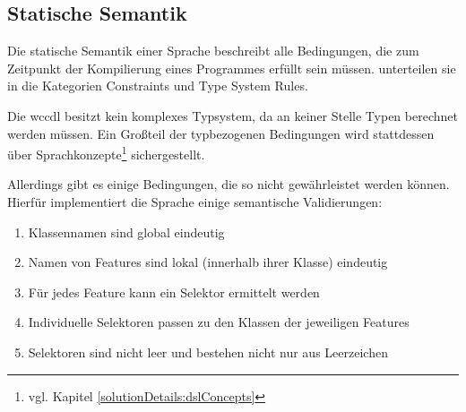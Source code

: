 \subsection{Statische Semantik}
    \label{section:solutionDetailsDslStaticSemantics}
    Die statische Semantik einer Sprache beschreibt alle Bedingungen,
    die zum Zeitpunkt der Kompilierung eines Programmes erfüllt sein müssen.
    \citet[Kapitel 4.3]{voelter:DslEngineering} unterteilen sie in die Kategorien
    Constraints und Type System Rules.

    Die \gls{wccdl} besitzt kein komplexes Typsystem,
    da an keiner Stelle Typen berechnet werden müssen.
    Ein Großteil der typbezogenen Bedingungen wird stattdessen über
    Sprachkonzepte\footnote{vgl. Kapitel \ref{solutionDetails:dslConcepts}}
    sichergestellt.

    Allerdings gibt es einige Bedingungen, die so nicht gewährleistet werden können.
    Hierfür implementiert die Sprache einige semantische Validierungen:

    \begin{enumerate}
        \item Klassennamen sind global eindeutig
        \item Namen von Features sind lokal (innerhalb ihrer Klasse) eindeutig
        \item Für jedes Feature kann ein Selektor ermittelt werden
        \item Individuelle Selektoren passen zu den Klassen der jeweiligen Features
        \item Selektoren sind nicht leer und bestehen nicht nur aus Leerzeichen
    \end{enumerate}
